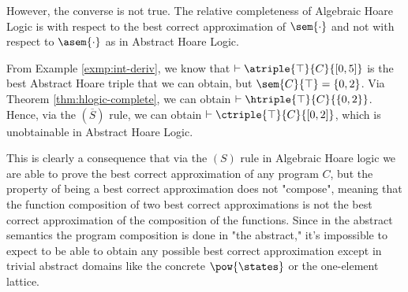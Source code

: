 However, the converse is not true. The relative completeness of Algebraic Hoare
Logic is with respect to the best correct approximation of $\sem{\cdot}$ and not
with respect to $\asem{\cdot}$ as in Abstract Hoare Logic.

\begin{example}
  From Example \ref{exmp:int-deriv}, we know that $\vdash \atriple{\top}{C}{[0, 5]}$ is
  the best Abstract Hoare triple that we can obtain, but $\sem{C}{\top} = \{0,
  2\}$. Via Theorem \ref{thm:hlogic-complete}, we can obtain
  $\vdash \htriple{\top}{C}{\{0, 2\}}$. Hence, via the $(\overline{S})$ rule, we can
  obtain $\vdash \ctriple{\top}{C}{[0, 2]}$, which is unobtainable in Abstract Hoare
  Logic.
\end{example}

This is clearly a consequence that via the $(S)$ rule in Algebraic Hoare logic
we are able to prove the best correct approximation of any program $C$, but the 
property of being a best correct approximation does not "compose",
meaning that the function composition of two best correct approximations is not
the best correct approximation of the composition of the functions. Since in the
abstract semantics the program composition is done in "the abstract," it's
impossible to expect to be able to obtain any possible best correct
approximation except in trivial abstract domains like the concrete
$\pow{\states}$ or the one-element lattice.
